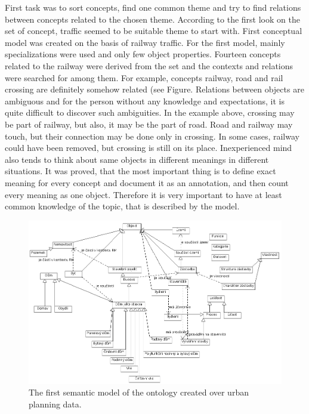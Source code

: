 \documentclass{lncs-template/llncs}
\begin{document}
First task was to sort concepts, find one common theme and try to find relations between concepts related to the chosen theme. According to the first look on the set of concept, traffic seemed to be suitable theme to start with. First conceptual model was created on the basis of railway traffic. For the first model, mainly specializations were used and only few object properties. Fourteen concepts related to the railway were derived from the set and the contexts and relations were searched for among them. For example, concepts railway, road and rail crossing are definitely somehow related (see Figure. Relations between objects are ambiguous and for the person without any knowledge and expectations, it is quite difficult to discover such ambiguities. In the example above, crossing may be part of railway, but also, it may be the part of road. Road and railway may touch, but their connection may be done only in crossing. In some cases, railway could have been removed, but crossing is still on its place. Inexperienced mind also tends to think about same objects in different meanings in different situations. It was proved, that the most important thing is to define exact meaning for every concept and document it as an annotation, and then count every meaning as one object. Therefore it is very important to have at least common knowledge of the topic, that is described by the model. 

\begin{figure}
 \includegraphics[width=1.0\textwidth]{images/znalostniModel.png}
 \caption{The first semantic model of the ontology created over urban planning data.}\label{fig:model_june}
\end{figure}
\end{document}
